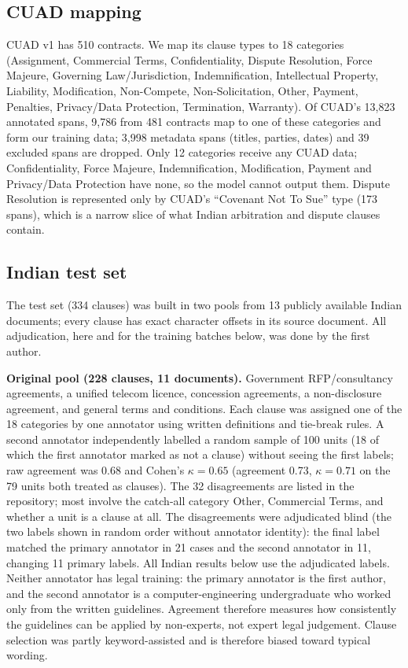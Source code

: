 \documentclass[conference]{IEEEtran}
\begin{document}
\subsection{CUAD mapping}
CUAD v1 has 510 contracts. We map its clause types to 18 categories (Assignment, Commercial Terms, Confidentiality, Dispute Resolution, Force Majeure, Governing Law/Jurisdiction, Indemnification, Intellectual Property, Liability, Modification, Non-Compete, Non-Solicitation, Other, Payment, Penalties, Privacy/Data Protection, Termination, Warranty). Of CUAD's 13,823 annotated spans, 9,786 from 481 contracts map to one of these categories and form our training data; 3,998 metadata spans (titles, parties, dates) and 39 excluded spans are dropped. Only 12 categories receive any CUAD data; Confidentiality, Force Majeure, Indemnification, Modification, Payment and Privacy/Data Protection have none, so the model cannot output them. Dispute Resolution is represented only by CUAD's ``Covenant Not To Sue'' type (173 spans), which is a narrow slice of what Indian arbitration and dispute clauses contain.

\subsection{Indian test set}
The test set (334 clauses) was built in two pools from 13 publicly available Indian documents; every clause has exact character offsets in its source document. All adjudication, here and for the training batches below, was done by the first author.

\textbf{Original pool (228 clauses, 11 documents).} Government RFP/consultancy agreements, a unified telecom licence, concession agreements, a non-disclosure agreement, and general terms and conditions. Each clause was assigned one of the 18 categories by one annotator using written definitions and tie-break rules. A second annotator independently labelled a random sample of 100 units (18 of which the first annotator marked as not a clause) without seeing the first labels; raw agreement was 0.68 and Cohen's $\kappa=0.65$ (agreement 0.73, $\kappa=0.71$ on the 79 units both treated as clauses). The 32 disagreements are listed in the repository; most involve the catch-all category Other, Commercial Terms, and whether a unit is a clause at all. The disagreements were adjudicated blind (the two labels shown in random order without annotator identity): the final label matched the primary annotator in 21 cases and the second annotator in 11, changing 11 primary labels. All Indian results below use the adjudicated labels. Neither annotator has legal training: the primary annotator is the first author, and the second annotator is a computer-engineering undergraduate who worked only from the written guidelines. Agreement therefore measures how consistently the guidelines can be applied by non-experts, not expert legal judgement. Clause selection was partly keyword-assisted and is therefore biased toward typical wording.
\end{document}
